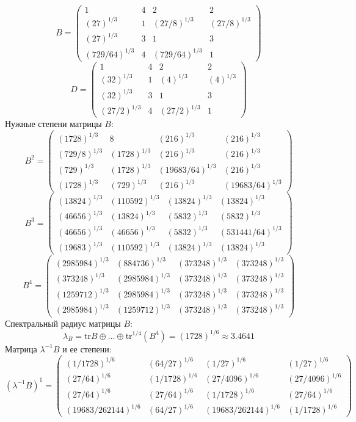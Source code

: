 $$B = \begin{pmatrix}
1 & 4 & 2 & 2\\
(27)^{1/3} & 1 & (27/8)^{1/3} & (27/8)^{1/3}\\
(27)^{1/3} & 3 & 1 & 3\\
(729/64)^{1/3} & 4 & (729/64)^{1/3} & 1
\end{pmatrix}
$$
$$D = \begin{pmatrix}
1 & 4 & 2 & 2\\
(32)^{1/3} & 1 & (4)^{1/3} & (4)^{1/3}\\
(32)^{1/3} & 3 & 1 & 3\\
(27/2)^{1/3} & 4 & (27/2)^{1/3} & 1
\end{pmatrix}
$$
Нужные степени матрицы $B$:
$$B^2 = \begin{pmatrix}
(1728)^{1/3} & 8 & (216)^{1/3} & (216)^{1/3}\\
(729/8)^{1/3} & (1728)^{1/3} & (216)^{1/3} & (216)^{1/3}\\
(729)^{1/3} & (1728)^{1/3} & (19683/64)^{1/3} & (216)^{1/3}\\
(1728)^{1/3} & (729)^{1/3} & (216)^{1/3} & (19683/64)^{1/3}
\end{pmatrix}
$$
$$B^3 = \begin{pmatrix}
(13824)^{1/3} & (110592)^{1/3} & (13824)^{1/3} & (13824)^{1/3}\\
(46656)^{1/3} & (13824)^{1/3} & (5832)^{1/3} & (5832)^{1/3}\\
(46656)^{1/3} & (46656)^{1/3} & (5832)^{1/3} & (531441/64)^{1/3}\\
(19683)^{1/3} & (110592)^{1/3} & (13824)^{1/3} & (13824)^{1/3}
\end{pmatrix}
$$
$$B^4 = \begin{pmatrix}
(2985984)^{1/3} & (884736)^{1/3} & (373248)^{1/3} & (373248)^{1/3}\\
(373248)^{1/3} & (2985984)^{1/3} & (373248)^{1/3} & (373248)^{1/3}\\
(1259712)^{1/3} & (2985984)^{1/3} & (373248)^{1/3} & (373248)^{1/3}\\
(2985984)^{1/3} & (1259712)^{1/3} & (373248)^{1/3} & (373248)^{1/3}
\end{pmatrix}
$$
Спектральный радиус матрицы $B$:
$$\lambda_{B} = \mathrm{tr}B\oplus \dots \oplus \mathrm{tr}^{1/4}(B^{4}) = (1728)^{1/6} \approx 3.4641$$
Матрица $\lambda^{-1}B$ и ее степени:
$$(\lambda^{-1}B)^1 = \begin{pmatrix}
(1/1728)^{1/6} & (64/27)^{1/6} & (1/27)^{1/6} & (1/27)^{1/6}\\
(27/64)^{1/6} & (1/1728)^{1/6} & (27/4096)^{1/6} & (27/4096)^{1/6}\\
(27/64)^{1/6} & (27/64)^{1/6} & (1/1728)^{1/6} & (27/64)^{1/6}\\
(19683/262144)^{1/6} & (64/27)^{1/6} & (19683/262144)^{1/6} & (1/1728)^{1/6}
\end{pmatrix}
$$
